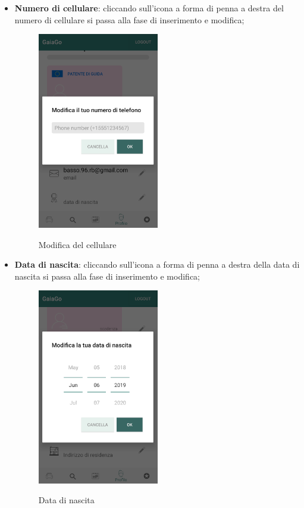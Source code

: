 \begin{itemize}
		\item \textbf{Numero di cellulare}: cliccando sull'icona a forma di penna a destra del numero di cellulare si passa alla fase di inserimento e modifica;
	\begin{figure}[H] 
		\centering 
		\includegraphics[width=0.5\textwidth]{res/images/modifica_cellulare.png}\\
		\caption{Modifica del cellulare}
		\label{modificell}
	\end{figure}
\pagebreak

\item \textbf{Data di nascita}: cliccando sull'icona a forma di penna a destra della data di nascita si passa alla fase di inserimento e modifica;
\begin{figure}[H] 
	\centering 
	\includegraphics[width=0.5\textwidth]{res/images/modifica_data_nascita.png}\\
	\caption{Data di nascita}
	\label{modificanascita}
\end{figure}
\pagebreak


\end{itemize}
